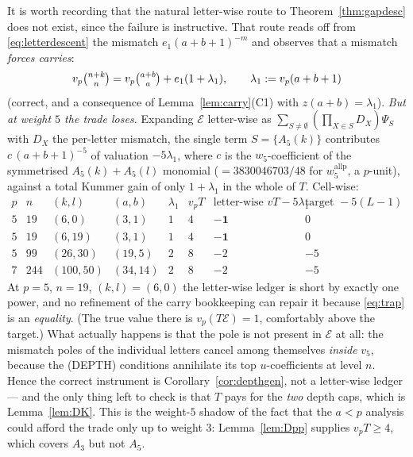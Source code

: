 \documentclass[11pt,reqno]{amsart}
\theoremstyle{plain}
\theoremstyle{definition}
\theoremstyle{remark}
\numberwithin{equation}{section}
\newcommand{\Ecal}{\mathcal{E}}
\newcommand{\wfive}{w_5}
\newcommand{\vfive}{v_5}
\begin{document}
It is worth recording that the natural letter-wise route to Theorem~\ref{thm:gapdesc} does not
exist, since the failure is instructive. That route reads off from \eqref{eq:letterdescent} the
mismatch $e_1(a+b+1)^{-m}$ and observes that a mismatch \emph{forces carries}:
\begin{equation}\label{eq:trap}
v_p\tbinom{n+k}{n}=v_p\tbinom{a+b}{a}+e_1(1+\lambda_1),\qquad \lambda_1:=v_p(a+b+1)
\end{equation}
(correct, and a consequence of Lemma~\ref{lem:carry}(C1) with $z(a+b)=\lambda_1$). \emph{But at weight $5$ the trade
loses.} Expanding $\Ecal$ letter-wise as $\sum_{S\ne\emptyset}(\prod_{X\in S}D_X)\Psi_S$ with
$D_X$ the per-letter mismatch, the single term $S=\{A_5(k)\}$ contributes
$c\,(a+b+1)^{-5}$ of valuation $-5\lambda_1$, where $c$ is the $\wfive$-coefficient of the
symmetrised $A_5(k)+A_5(l)$ monomial ($=3830046703/48$ for $w_5^{\mathrm{allp}}$, a $p$-unit),
against a total Kummer gain of only $1+\lambda_1$ in the whole of $T$. Cell-wise:
\[
\begin{array}{cccccccc}
p & n & (k,l) & (a,b) & \lambda_1 & v_pT & \text{letter-wise } vT-5\lambda_1 & \text{target }-5(L-1)\\\hline
5 & 19 & (6,0) & (3,1) & 1 & 4 & \mathbf{-1} & 0\\
5 & 19 & (6,19) & (3,1) & 1 & 4 & \mathbf{-1} & 0\\
5 & 99 & (26,30) & (19,5) & 2 & 8 & -2 & -5\\
7 & 244 & (100,50) & (34,14) & 2 & 8 & -2 & -5
\end{array}
\]
At $p=5$, $n=19$, $(k,l)=(6,0)$ the letter-wise ledger is short by exactly one power, and no
refinement of the carry bookkeeping can repair it because \eqref{eq:trap} is an
\emph{equality}. (The true value there is $v_p(T\Ecal)=1$, comfortably above the target.) What
actually happens is that the pole is not present in $\Ecal$ at all: the mismatch poles of the
individual letters cancel among themselves \emph{inside} $\vfive$, because the (DEPTH)
conditions annihilate its top $u$-coefficients at level $n$. Hence the correct instrument is
Corollary~\ref{cor:depthgen}, not a letter-wise ledger --- and the only thing left to check is
that $T$ pays for the \emph{two} depth caps, which is Lemma~\ref{lem:DK}. This is the weight-$5$
shadow of the fact that the $a<p$ analysis could afford the trade only up to weight $3$:
Lemma~\ref{lem:Dpp} supplies $v_pT\ge4$, which covers $A_3$ but not $A_5$.
\end{document}
